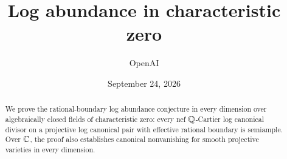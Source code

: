 \documentclass[11pt,letterpaper]{article}
\title{Log abundance in characteristic zero}
\author{OpenAI}
\date{September 24, 2026}
\begin{document}
\maketitle
\begin{abstract}
We prove the rational-boundary log abundance conjecture in every dimension
over algebraically closed fields of characteristic zero: every nef
\(\mathbb{Q}\)-Cartier log canonical divisor on a projective log canonical pair with
effective rational boundary is semiample. Over \(\mathbb{C}\), the proof also
establishes canonical nonvanishing for smooth projective varieties in every
dimension.
\end{abstract}
\tableofcontents
















\end{document}
